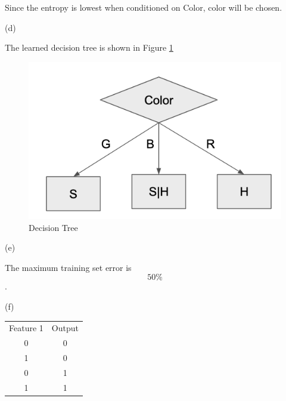 \documentclass[11pt]{article}
\begin{document}
\begin{enumerate}
Since the entropy is lowest when conditioned on Color, color will be chosen.

\medskip

(d)

The learned decision tree is shown in Figure \ref{fig:dt}
\begin{figure}[!h]
  \centering
  \includegraphics[width=\linewidth]{figures/dt.png}
  \caption{Decision Tree}
  \label{fig:dt}
\end{figure}

\medskip

(e)

The maximum training set error is $$ 50\% $$.

(f)

\begin{center}
  \begin{tabular}{ |c|c| }
   \hline
   Feature 1 & Output \\
   0 & 0 \\
   1 & 0 \\
   0 & 1 \\
   1 & 1 \\
   \hline
  \end{tabular}
\end{center}


\end{enumerate}
\end{document}
